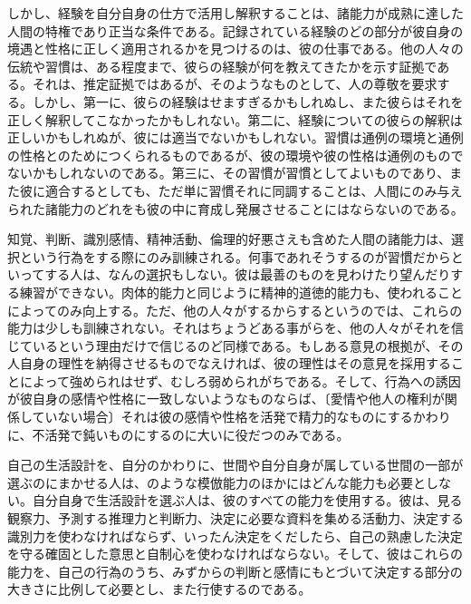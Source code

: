 しかし、経験を自分自身の仕方で活用し解釈することは、諸能力が成熟に達した人間の特権であり正当な条件である。記録されている経験のどの部分が彼自身の境遇と性格に正しく適用されるかを見つけるのは、彼の仕事である。他の人々の伝統や習慣は、ある程度まで、彼らの経験が何を教えてきたかを示す証拠である。それは、推定証拠ではあるが、そのようなものとして、人の尊敬を要求する。しかし、第一に、彼らの経験はせますぎるかもしれぬし、また彼らはそれを正しく解釈してこなかったかもしれない。第二に、経験についての彼らの解釈は正しいかもしれぬが、彼には適当でないかもしれない。習慣は通例の環境と通例の性格とのためにつくられるものであるが、彼の環境や彼の性格は通例のものでないかもしれないのである。第三に、その習慣が習慣としてよいものであり、また彼に適合するとしても、ただ単に習慣それに同調することは、人間にのみ与えられた諸能力のどれをも彼の中に育成し発展させることにはならないのである。

知覚、判断、識別感情、精神活動、倫理的好悪さえも含めた人間の諸能力は、選択という行為をする際にのみ訓練される。何事であれそうするのが習慣だからといってする人は、なんの選択もしない。彼は最善のものを見わけたり望んだりする練習ができない。肉体的能力と同じように精神的道徳的能力も、使われることによってのみ向上する。ただ、他の人々がするからするというのでは、これらの能力は少しも訓練されない。それはちょうどある事がらを、他の人々がそれを信じているという理由だけで信じるのど同様である。もしある意見の根拠が、その人自身の理性を納得させるものでなえければ、彼の理性はその意見を採用することによって強められはせず、むしろ弱められがちである。そして、行為への誘因が彼自身の感情や性格に一致しないようなものならば、〔愛情や他人の権利が関係していない場合〕それは彼の感情や性格を活発で精力的なものにするかわりに、不活発で鈍いものにするのに大いに役だつのみである。

自己の生活設計を、自分のかわりに、世間や自分自身が属している世間の一部が選ぶのにまかせる人は、のような模倣能力のほかにはどんな能力も必要としない。自分自身で生活設計を選ぶ人は、彼のすべての能力を使用する。彼は、見る観察力、予測する推理力と判断力、決定に必要な資料を集める活動力、決定する識別力を使わなければならず、いったん決定をくだしたら、自己の熟慮した決定を守る確固とした意思と自制心を使わなければならない。そして、彼はこれらの能力を、自己の行為のうち、みずからの判断と感情にもとづいて決定する部分の大きさに比例して必要とし、また行使するのである。

